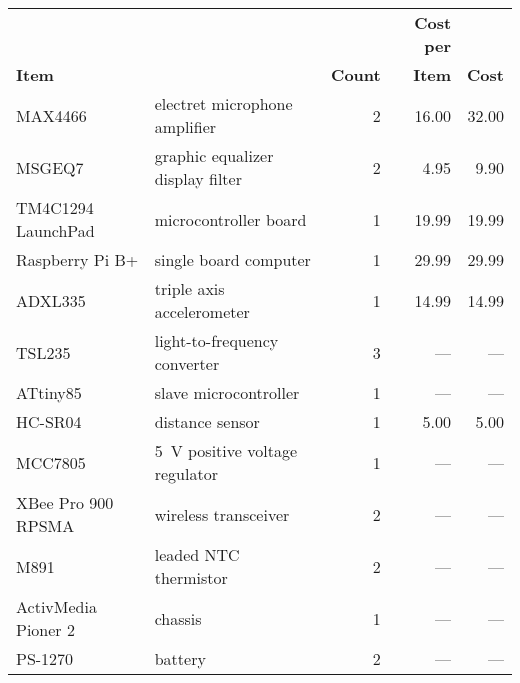{\footnotesize
\begin{tabular}{llrrr}
                                                            &&                  & \textbf{Cost per}     &                       \\
    \multicolumn{2}{l}{\textbf{Item}}                       & \textbf{Count}    & \textbf{Item}         & \textbf{Cost}         \\ \hline
    MAX4466 & electret microphone amplifier                 & 2                 & 16.00                 & 32.00                 \\
    MSGEQ7 & graphic equalizer display filter               & 2                 & 4.95                  & 9.90                  \\
    TM4C1294 LaunchPad & microcontroller board              & 1                 & 19.99                 & 19.99                 \\
    Raspberry Pi B+ & single board computer                 & 1                 & 29.99                 & 29.99                 \\
    ADXL335 & triple axis accelerometer                     & 1                 & 14.99                 & 14.99                 \\
    TSL235 & light-to-frequency converter                   & 3                 & ---                   & ---                   \\
    ATtiny85 & slave microcontroller                        & 1                 & ---                   & ---                   \\
    HC-SR04 & distance sensor                               & 1                 & 5.00                  & 5.00                  \\
    MCC7805 & \SI{5}{\volt} positive voltage regulator      & 1                 & ---                   & ---                   \\
    XBee Pro 900 RPSMA & wireless transceiver               & 2                 & ---                   & ---                   \\
    M891 & leaded NTC thermistor                            & 2                 & ---                   & ---                   \\
    ActivMedia Pioner 2 & chassis                           & 1                 & ---                   & ---                   \\
    PS-1270 & battery                                       & 2                 & ---                   & ---                   \\

\end{tabular}}
